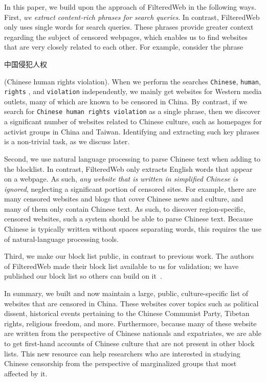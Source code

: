 In this paper, we build upon the approach of FilteredWeb in the
following ways. First, {\em we extract content-rich phrases
for search queries}. In contrast, FilteredWeb only uses single words
for search queries. These phrases provide greater context regarding
the subject of censored webpages, which enables us to find websites
that are very closely related to each other. For example, consider the
phrase \begin{CJK*}{UTF8}{gbsn}中国侵犯人权 \end{CJK*} (Chinese human
rights violation). When we perform the searches \texttt{Chinese},
\texttt{human}, \texttt{rights} , and \texttt{violation}
independently, we mainly get websites for Western media outlets, many
of which are known to be censored in China. By contrast, if we search
for \texttt{Chinese human rights violation} as a single phrase, then
we discover a significant number of websites related to Chinese
culture, such as homepages for activist groups in China and
Taiwan. Identifying and extracting such key phrases is a non-trivial
task, as we discuss later.

Second, we use natural language processing to parse Chinese text
when adding to the blocklist. In contrast, FilteredWeb only extracts English
words that appear on a webpage. As such, \textit{any website that is written
in simplified Chinese is ignored}, neglecting a significant portion of
censored sites. For example, there are many censored websites and blogs that
cover Chinese news and culture, and many of them only contain Chinese text. As
such, to discover region-specific, censored websites, such a system should be
able to parse Chinese text. Because Chinese is typically written without
spaces separating words, this requires the use of natural-language processing
tools.

Third, we make our block list public, in contrast to previous work. The
authors of FilteredWeb made their block list available to us for validation;
we have published our block list so others can build on
it~\cite{censorsearch-lists}.

In summary, we built and now maintain a large, public, culture-specific list
of websites that are censored in China. These websites cover topics such as
political dissent, historical events pertaining to the Chinese Communist
Party, Tibetan rights, religious freedom, and more. Furthermore, because many
of these website are written from the perspective of Chinese nationals and expatriates,
we are able to get first-hand accounts of Chinese culture that are
not present in other block lists. This new resource can help researchers who
are interested in studying Chinese censorship from the perspective of
marginalized groups that most affected by it.

